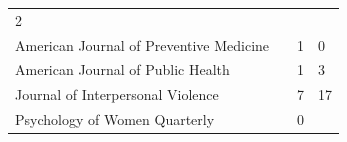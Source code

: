 \documentclass[]{tufte-handout}
\begin{document}
\begin{longtable}[]{@{}llll@{}}
\begin{minipage}[t]{0.06\columnwidth}
2\strut
\end{minipage}\tabularnewline
\begin{minipage}[t]{0.53\columnwidth}\raggedright\strut
American Journal of Preventive Medicine\strut
\end{minipage} & \begin{minipage}[t]{0.09\columnwidth}\raggedright\strut
\strut
\end{minipage} & \begin{minipage}[t]{0.06\columnwidth}\raggedright\strut
1\strut
\end{minipage} & \begin{minipage}[t]{0.06\columnwidth}\raggedright\strut
0\strut
\end{minipage}\tabularnewline
\begin{minipage}[t]{0.53\columnwidth}\raggedright\strut
American Journal of Public Health\strut
\end{minipage} & \begin{minipage}[t]{0.09\columnwidth}\raggedright\strut
\strut
\end{minipage} & \begin{minipage}[t]{0.06\columnwidth}\raggedright\strut
1\strut
\end{minipage} & \begin{minipage}[t]{0.06\columnwidth}\raggedright\strut
3\strut
\end{minipage}\tabularnewline
\begin{minipage}[t]{0.53\columnwidth}\raggedright\strut
Journal of Interpersonal Violence\strut
\end{minipage} & \begin{minipage}[t]{0.09\columnwidth}\raggedright\strut
\strut
\end{minipage} & \begin{minipage}[t]{0.06\columnwidth}\raggedright\strut
7\strut
\end{minipage} & \begin{minipage}[t]{0.06\columnwidth}\raggedright\strut
17\strut
\end{minipage}\tabularnewline
\begin{minipage}[t]{0.53\columnwidth}\raggedright\strut
Psychology of Women Quarterly\strut
\end{minipage} & \begin{minipage}[t]{0.09\columnwidth}\raggedright\strut
\strut
\end{minipage} & \begin{minipage}[t]{0.06\columnwidth}\raggedright\strut
0\strut

\end{minipage}
\end{longtable}
\end{document}
